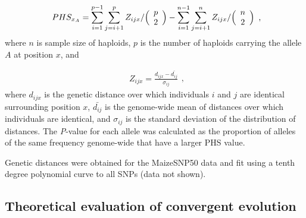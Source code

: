 \begin{equation}
  \label{phs-1}
  \begin{array}{l}
  \displaystyle{
PHS_{x_A} = \sum^{p-1}_{i=1}\sum^{p}_{j=i+1}Z_{ijx}  / \Bigl( \begin{array}{c} p \\ 2 \\ \end{array} \Bigr) 
- \sum^{n-1}_{i=1}\sum^{n}_{j=i+1}Z_{ijx}  / \Bigl( \begin{array}{c} n \\ 2 \\ \end{array} \Bigr) 
  }
  \end {array} 
  \textrm{,}
\end{equation}
\noindent where $n$ is sample size of haploids, $p$  is the number of haploids carrying the allele $A$ at position $x$, and

\begin{equation}
  \label{phs-2}
  \begin{array}{l}
  \displaystyle{
Z_{ijx} = \frac{ d_{ijx} - \bar{d_{ij}} }{ \sigma_{ij} }
  }
  \end {array} 
  \textrm{,}
\end{equation}
\noindent where $d_{ijx}$ is the genetic distance over which individuals $i$ and $j$ are identical surrounding position $x$, $\bar{d_{ij}}$ is the genome-wide mean of distances over which individuals are identical, and $\sigma_{ij}$ is the standard deviation of the distribution of distances.  
The \emph{P}-value for each allele was calculated as the proportion of alleles of the same frequency genome-wide that have a larger PHS value. 

Genetic distances were obtained for the MaizeSNP50 data \cite[]{Ganal_2011_22174790} and fit using a tenth degree polynomial curve to all SNPs (data not shown).
 




\subsection*{Theoretical evaluation of convergent evolution }


